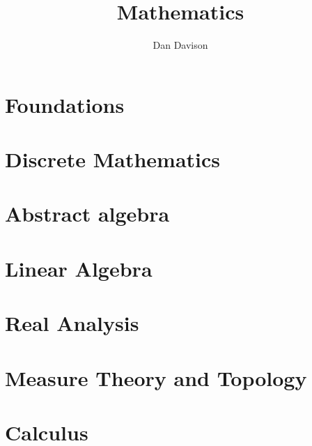 \documentclass{book}
\title{Mathematics}
\author{Dan Davison}
\begin{document}
\frontmatter
\maketitle
\tableofcontents
\mainmatter


\chapter{Foundations}


\chapter{Discrete Mathematics}


\chapter{Abstract algebra}


\chapter{Linear Algebra}




\chapter{Real Analysis}


\chapter{Measure Theory and Topology}

















\chapter{Calculus}






\end{document}
